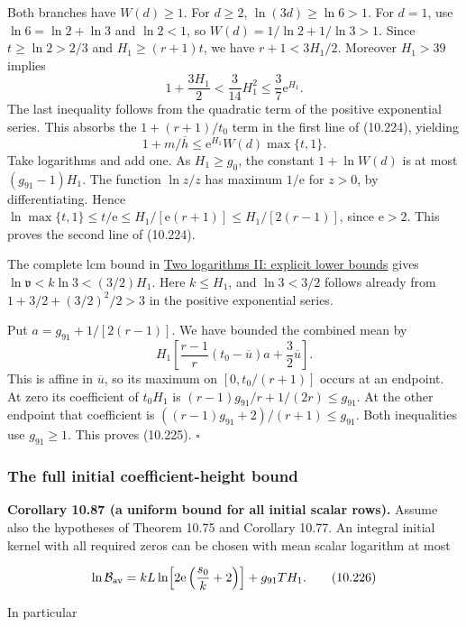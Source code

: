 \documentclass[
  11pt,
  a4paper,
]{article}
\begin{document}
Both branches have \(W(d)\ge1\). For \(d\ge2\), \(\ln(3d)\ge\ln6>1\).
For \(d=1\), use \(\ln6=\ln2+\ln3\) and \(\ln2<1\), so
\(W(d)=1/\ln2+1/\ln3>1\). Since \(t\ge\ln2>2/3\) and \(H_1\ge(r+1)t\),
we have \(r+1<3H_1/2\). Moreover \(H_1>39\) implies \[
1+\frac{3H_1}{2}<\frac3{14}H_1^2
\le\frac37\mathrm e^{H_1}.
\] The last inequality follows from the quadratic term of the positive
exponential series. This absorbs the \(1+(r+1)/t_0\) term in the first
line of (10.224), yielding \[
1+m/\overline h\le
\mathrm e^{H_1}W(d)\max\{t,1\}.
\] Take logarithms and add one. As \(H_1\ge g_0\), the constant
\(1+\ln W(d)\) is at most \((g_{91}-1)H_1\). The function \(\ln z/z\)
has maximum \(1/\mathrm e\) for \(z>0\), by differentiating. Hence
\(\ln\max\{t,1\}\le t/\mathrm e\le H_1/[\mathrm e(r+1)]\le H_1/[2(r-1)]\),
since \(\mathrm e>2\). This proves the second line of (10.224).

The complete lcm bound in
\href{../TR-BAKER-07.html\#an-exponential-bound-for-least-common-multiples}{Two
logarithms II: explicit lower bounds} gives
\(\ln\mathfrak v<k\ln3<(3/2)H_1\). Here \(k\le H_1\), and \(\ln3<3/2\)
follows already from \(1+3/2+(3/2)^2/2>3\) in the positive exponential
series.

Put \(a=g_{91}+1/[2(r-1)]\). We have bounded the combined mean by \[
H_1\left[\frac{r-1}{r}(t_0-\overline u)a+
                       \frac32\overline u\right].
\] This is affine in \(\overline u\), so its maximum on
\([0,t_0/(r+1)]\) occurs at an endpoint. At zero its coefficient of
\(t_0H_1\) is \((r-1)g_{91}/r+1/(2r)\le g_{91}\). At the other endpoint
that coefficient is \(((r-1)g_{91}+2)/(r+1)\le g_{91}\). Both
inequalities use \(g_{91}\ge1\). This proves (10.225). \(\square\)

\subsubsection{The full initial coefficient-height
bound}\label{the-full-initial-coefficient-height-bound}

\textbf{Corollary 10.87 (a uniform bound for all initial scalar rows).}
Assume also the hypotheses of Theorem 10.75 and Corollary 10.77. An
integral initial kernel with all required zeros can be chosen with mean
scalar logarithm at most

\[
\ln\mathcal B_{\rm av}
=kL\ln\!\left[2\mathrm e\left(\frac{s_0}{k}+2\right)\right]
                    +g_{91}TH_1.
\tag{10.226}
\]

In particular
\end{document}
